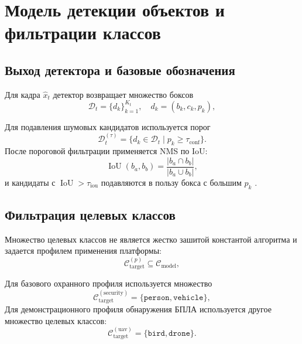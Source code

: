 \section{Модель детекции объектов и фильтрации классов}

\subsection{Выход детектора и базовые обозначения}

Для кадра \(\hat{x}_t\) детектор возвращает множество боксов
\begin{equation}
\mathcal{D}_t = \{d_k\}_{k=1}^{K_t}, \quad
d_k = (b_k, c_k, p_k),
\end{equation}
\where
{}

Для подавления шумовых кандидатов используется порог
\begin{equation}
\mathcal{D}^{(\tau)}_t = \{d_k \in \mathcal{D}_t \mid p_k \ge \tau_{\text{conf}}\}.
\end{equation}
После пороговой фильтрации применяется NMS по IoU:
\begin{equation}
\operatorname{IoU}(b_a,b_b) = \frac{|b_a \cap b_b|}{|b_a \cup b_b|},
\end{equation}
и кандидаты с \(\operatorname{IoU} > \tau_{\text{iou}}\) подавляются в пользу бокса с большим \(p_k\) \cite{redmon2018yolov3,coco_dataset}.

\subsection{Фильтрация целевых классов}

Множество целевых классов не является жестко зашитой константой алгоритма и задается профилем применения платформы:
\begin{equation}
\mathcal{C}_{\text{target}}^{(p)} \subseteq \mathcal{C}_{\text{model}},
\end{equation}
\where
{}

Для базового охранного профиля используется множество
\begin{equation}
\mathcal{C}_{\text{target}}^{(\text{security})} =
\{\texttt{person}, \texttt{vehicle}\},
\end{equation}
\where
{}
Для демонстрационного профиля обнаружения БПЛА используется другое множество целевых классов:
\begin{equation}
\mathcal{C}_{\text{target}}^{(\text{uav})} =
\{\texttt{bird}, \texttt{drone}\}.
\end{equation}

